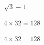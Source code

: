\documentclass{article}
\begin{document}
$ \sqrt{3}-1 $
\pagebreak

$4
\times 32 = 128$
\pagebreak

$4 \times 32 = 128$
\pagebreak
\end{document}
